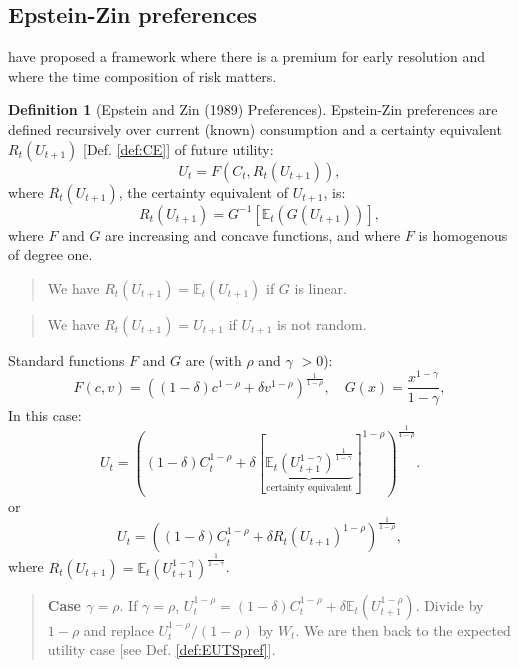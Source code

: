 \documentclass[
  12pt,
]{book}
\theoremstyle{definition}
\newtheorem{definition}{Definition}[chapter]
\theoremstyle{definition}
\theoremstyle{definition}
\theoremstyle{definition}
\theoremstyle{remark}
\begin{document}
\hypertarget{epstein-zin-preferences}{%
\subsection{Epstein-Zin preferences}\label{epstein-zin-preferences}}

\citet{Epstein_Zin_1989} have proposed a framework where there is a premium for early resolution and where the time composition of risk matters.

\begin{definition}[Epstein and Zin (1989) Preferences]
\protect\hypertarget{def:EZ}{}\label{def:EZ}Epstein-Zin preferences are defined recursively over current (known) consumption and a certainty equivalent
\(R_t(U_{t+1})\) {[}Def. \ref{def:CE}{]} of future utility:
\[
U_{t} = F(C_t,R_t(U_{t+1})),
\]
where \(R_t(U_{t+1})\), the certainty equivalent of \(U_{t+1}\), is:
\[
R_t(U_{t+1}) = G^{-1}[\mathbb{E}_t(G(U_{t+1}))],
\]
where \(F\) and \(G\) are increasing and concave functions, and where \(F\) is homogenous of degree one.
\end{definition}

\begin{quote}
We have \(R_t(U_{t+1})=\mathbb{E}_t(U_{t+1})\) if \(G\) is linear.
\end{quote}

\begin{quote}
We have \(R_t(U_{t+1})=U_{t+1}\) if \(U_{t+1}\) is not random.
\end{quote}

Standard functions \(F\) and \(G\) are (with \(\rho\) and \(\gamma\) \(>0\)):
\[
F(c,v) = \left((1-\delta)c^{1-\rho} + \delta v^{1-\rho}\right)^{\frac{1}{1-\rho}}, \quad G(x)=\frac{x^{1-\gamma}}{1-\gamma},
\]
In this case:
\begin{equation}
\boxed{ U_t = \left((1-\delta)C_t^{1-\rho}+\delta \left[\underbrace{ \mathbb{E}_t\left(U_{t+1}^{1-\gamma}\right)^{\frac{1}{1-\gamma}} }_{\mbox{certainty equivalent}}\right] ^{1-\rho}\right)^{\frac{1}{1-\rho}}.}\label{eq:EZpreferences}
\end{equation}
or
\begin{equation}
U_t = \left((1-\delta)C_t^{1-\rho} + \delta R_t(U_{t+1})^{1-\rho}\right)^{\frac{1}{1-\rho}},\label{eq:EZpreferences2}
\end{equation}
where \(R_t(U_{t+1})=\mathbb{E}_t(U_{t+1}^{1-\gamma})^{\frac{1}{1-\gamma}}\).

\begin{quote}
\textbf{Case \(\gamma = \rho\)}. If \(\gamma = \rho\), \(U_t^{1-\rho}=(1-\delta)C_t^{1-\rho} + \delta \mathbb{E}_t(U_{t+1}^{1-\rho})\).
Divide by \(1-\rho\) and replace \(U_t^{1-\rho}/(1-\rho)\) by \(W_t\). We are then back to the expected utility case {[}see Def. \ref{def:EUTSpref}{]}.
\end{quote}
\end{document}
